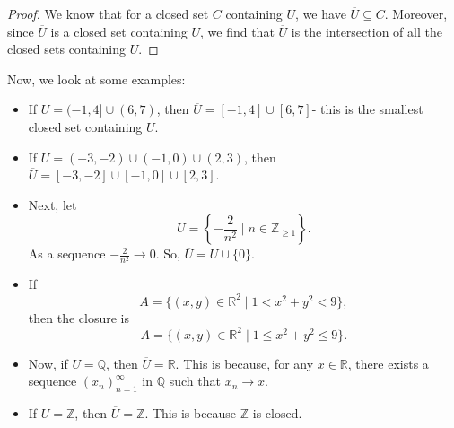 \documentclass[a4paper, openany]{memoir}
\theoremstyle{definition}
\theoremstyle{plain}
\begin{document}
\begin{proof}
We know that for a closed set $C$ containing $U$, we have $\overline{U} \subseteq C$. Moreover, since $\overline{U}$ is a closed set containing $U$, we find that $\overline{U}$ is the intersection of all the closed sets containing $U$.
\end{proof}
Now, we look at some examples:
\begin{itemize}
    \item If $U = (-1, 4] \cup (6, 7)$, then $\overline{U} = [-1, 4] \cup [6, 7]$- this is the smallest closed set containing $U$. 
    \item If $U = (-3, -2) \cup (-1, 0) \cup (2, 3)$, then $\overline{U} = [-3, -2] \cup [-1, 0] \cup [2, 3]$. 
    \item Next, let
    \[U = \left\{-\frac{2}{n^2} \mid n \in \mathbb{Z}_{\geqslant 1}\right\}.\]
    As a sequence $-\frac{2}{n^2} \to 0$. So, $\overline{U} = U \cup \{0\}$.
    \item If
    \[A = \{(x, y) \in \mathbb{R}^2 \mid 1 < x^2 + y^2 < 9\},\]
    then the closure is
    \[\overline{A} = \{(x, y) \in \mathbb{R}^2 \mid 1 \leqslant x^2 + y^2 \leqslant 9\}.\]
    \item Now, if $U = \mathbb{Q}$, then $\overline{U} = \mathbb{R}$. This is because, for any $x \in \mathbb{R}$, there exists a sequence $(x_n)_{n=1}^{\infty}$ in $\mathbb{Q}$ such that $x_n \to x$.
    \item If $U = \mathbb{Z}$, then $\overline{U} = \mathbb{Z}$. This is because $\mathbb{Z}$ is closed.
\end{itemize}
\end{document}

